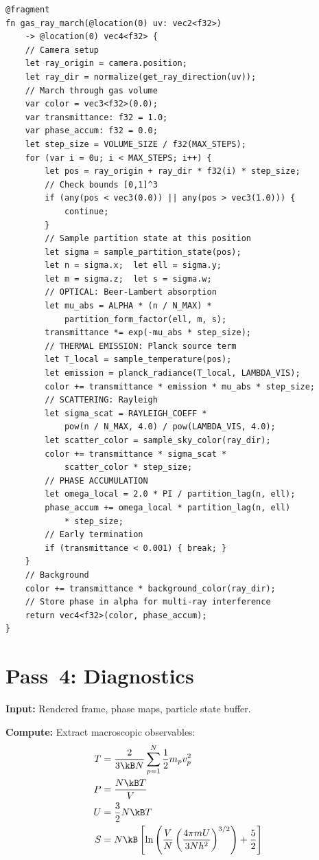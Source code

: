 \begin{lstlisting}[style=wgsl,caption={Pass 3: Gas Ray March (WGSL pseudocode)}]
@fragment
fn gas_ray_march(@location(0) uv: vec2<f32>)
    -> @location(0) vec4<f32> {
    // Camera setup
    let ray_origin = camera.position;
    let ray_dir = normalize(get_ray_direction(uv));
    // March through gas volume
    var color = vec3<f32>(0.0);
    var transmittance: f32 = 1.0;
    var phase_accum: f32 = 0.0;
    let step_size = VOLUME_SIZE / f32(MAX_STEPS);
    for (var i = 0u; i < MAX_STEPS; i++) {
        let pos = ray_origin + ray_dir * f32(i) * step_size;
        // Check bounds [0,1]^3
        if (any(pos < vec3(0.0)) || any(pos > vec3(1.0))) {
            continue;
        }
        // Sample partition state at this position
        let sigma = sample_partition_state(pos);
        let n = sigma.x;  let ell = sigma.y;
        let m = sigma.z;  let s = sigma.w;
        // OPTICAL: Beer-Lambert absorption
        let mu_abs = ALPHA * (n / N_MAX) *
            partition_form_factor(ell, m, s);
        transmittance *= exp(-mu_abs * step_size);
        // THERMAL EMISSION: Planck source term
        let T_local = sample_temperature(pos);
        let emission = planck_radiance(T_local, LAMBDA_VIS);
        color += transmittance * emission * mu_abs * step_size;
        // SCATTERING: Rayleigh
        let sigma_scat = RAYLEIGH_COEFF *
            pow(n / N_MAX, 4.0) / pow(LAMBDA_VIS, 4.0);
        let scatter_color = sample_sky_color(ray_dir);
        color += transmittance * sigma_scat *
            scatter_color * step_size;
        // PHASE ACCUMULATION
        let omega_local = 2.0 * PI / partition_lag(n, ell);
        phase_accum += omega_local * partition_lag(n, ell)
            * step_size;
        // Early termination
        if (transmittance < 0.001) { break; }
    }
    // Background
    color += transmittance * background_color(ray_dir);
    // Store phase in alpha for multi-ray interference
    return vec4<f32>(color, phase_accum);
}
\end{lstlisting}

\section{Pass~4: Diagnostics}
\label{sec:pass4}

\textbf{Input:} Rendered frame, phase maps, particle state buffer.

\textbf{Compute:} Extract macroscopic observables:
\begin{align}
    T &= \frac{2}{3\kB N} \sum_{p=1}^{N} \frac{1}{2}m_p v_p^2 \label{eq:diag_T} \\
    P &= \frac{N\kB T}{V} \label{eq:diag_P} \\
    U &= \frac{3}{2}N\kB T \label{eq:diag_U} \\
    S &= N\kB\left[\ln\left(\frac{V}{N}\left(\frac{4\pi m U}{3Nh^2}\right)^{3/2}\right) + \frac{5}{2}\right] \label{eq:diag_S}
\end{align}

